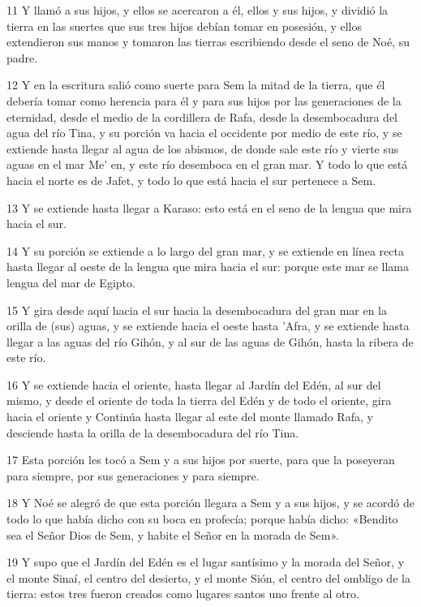 \par 11 Y llamó a sus hijos, y ellos se acercaron a él, ellos y sus hijos, y dividió la tierra en las suertes que sus tres hijos debían tomar en posesión, y ellos extendieron sus manos y tomaron las tierras escribiendo desde el seno de Noé, su padre.
\par 12 Y en la escritura salió como suerte para Sem la mitad de la tierra, que él debería tomar como herencia para él y para sus hijos por las generaciones de la eternidad, desde el medio de la cordillera de Rafa, desde la desembocadura del agua del río Tina, y su porción va hacia el occidente por medio de este río, y se extiende hasta llegar al agua de los abismos, de donde sale este río y vierte sus aguas en el mar Me' en, y este río desemboca en el gran mar. Y todo lo que está hacia el norte es de Jafet, y todo lo que está hacia el sur pertenece a Sem.
\par 13 Y se extiende hasta llegar a Karaso: esto está en el seno de la lengua que mira hacia el sur.
\par 14 Y su porción se extiende a lo largo del gran mar, y se extiende en línea recta hasta llegar al oeste de la lengua que mira hacia el sur: porque este mar se llama lengua del mar de Egipto.
\par 15 Y gira desde aquí hacia el sur hacia la desembocadura del gran mar en la orilla de (sus) aguas, y se extiende hacia el oeste hasta 'Afra, y se extiende hasta llegar a las aguas del río Gihón, y al sur de las aguas de Gihón, hasta la ribera de este río.
\par 16 Y se extiende hacia el oriente, hasta llegar al Jardín del Edén, al sur del mismo, y desde el oriente de toda la tierra del Edén y de todo el oriente, gira hacia el oriente y Continúa hasta llegar al este del monte llamado Rafa, y desciende hasta la orilla de la desembocadura del río Tina.
\par 17 Esta porción les tocó a Sem y a sus hijos por suerte, para que la poseyeran para siempre, por sus generaciones y para siempre.
\par 18 Y Noé se alegró de que esta porción llegara a Sem y a sus hijos, y se acordó de todo lo que había dicho con su boca en profecía; porque había dicho: «Bendito sea el Señor Dios de Sem, y habite el Señor en la morada de Sem».
\par 19 Y supo que el Jardín del Edén es el lugar santísimo y la morada del Señor, y el monte Sinaí, el centro del desierto, y el monte Sión, el centro del ombligo de la tierra: estos tres fueron creados como lugares santos uno frente al otro.
